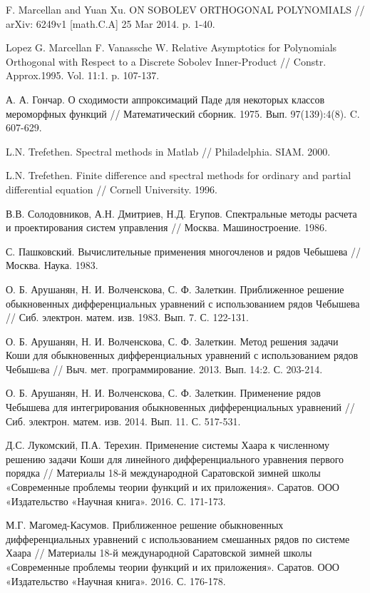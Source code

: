  F. Marcellan and Yuan Xu. ON SOBOLEV ORTHOGONAL POLYNOMIALS // arXiv: 6249v1 [math.C.A] 25 Mar 2014. p. 1-40.

 Lopez G. Marcellan F. Vanassche W. Relative Asymptotics for Polynomials Orthogonal with Respect to a Discrete Sobolev Inner-Product // Constr. Approx.1995. Vol. 11:1. p. 107-137.

 А. А. Гончар. О сходимости аппроксимаций Паде для некоторых классов мероморфных функций // Математический сборник. 1975. Вып. 97(139):4(8). C. 607-629.

 L.N. Trefethen. Spectral methods in Matlab // Philadelphia. SIAM. 2000.

 L.N. Trefethen. Finite difference and spectral methods for ordinary and partial differential equation // Cornell University. 1996.

 В.В. Солодовников, А.Н. Дмитриев, Н.Д. Егупов. Спектральные методы расчета и проектирования систем управления // Москва. Машиностроение. 1986.

 С. Пашковский. Вычислительные применения многочленов и рядов Чебышева // Москва. Наука. 1983.

 О. Б. Арушанян, Н. И. Волченскова, С. Ф. Залеткин. Приближенное решение обыкновенных дифференциальных уравнений с использованием рядов Чебышева // Сиб. электрон. матем. изв. 1983. Вып. 7. С. 122-131.

 О. Б. Арушанян, Н. И. Волченскова, С. Ф. Залеткин. Метод решения задачи Коши для обыкновенных дифференциальных уравнений с использованием рядов Чебышeва // Выч. мет. программирование. 2013. Вып. 14:2. С. 203-214.

 О. Б. Арушанян, Н. И. Волченскова, С. Ф. Залеткин. Применение рядов Чебышева для интегрирования обыкновенных дифференциальных уравнений // Сиб. электрон. матем. изв. 2014. Вып. 11. С. 517-531.

 Д.С. Лукомский, П.А. Терехин. Применение системы Хаара к численному решению задачи Коши для линейного дифференциального уравнения первого порядка // Материалы 18-й международной Саратовской зимней школы «Современные проблемы теории функций и их приложения». Саратов. ООО «Издательство «Научная книга». 2016. С. 171-173.

 М.Г. Магомед-Касумов. Приближенное решение обыкновенных дифференциальных уравнений с использованием смешанных рядов по системе Хаара // Материалы 18-й международной Саратовской зимней школы «Современные проблемы теории функций и их приложения». Саратов. ООО «Издательство «Научная книга». 2016. С. 176-178.

